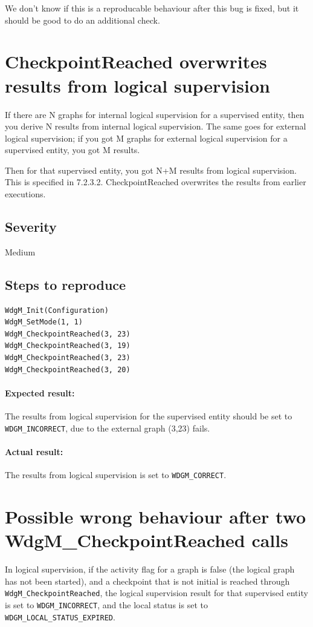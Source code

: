 We don't know if this is a reproducable behaviour after this bug is
fixed, but it should be good to do an additional check.

\section{CheckpointReached overwrites results from logical
  supervision}
If there are N graphs for internal logical supervision for a
supervised entity, then you derive N results from internal logical
supervision. The same goes for external logical supervision; if you
got M graphs for external logical supervision for a supervised entity,
you got M results.

Then for that supervised entity, you got N+M results from logical
supervision. This is specified in 7.2.3.2.
CheckpointReached overwrites the results from earlier executions.

\subsection{Severity}
Medium

\subsection{Steps to reproduce}
\begin{lstlisting}
WdgM_Init(Configuration)
WdgM_SetMode(1, 1)
WdgM_CheckpointReached(3, 23)
WdgM_CheckpointReached(3, 19)
WdgM_CheckpointReached(3, 23)
WdgM_CheckpointReached(3, 20)
\end{lstlisting}
\paragraph{Expected result:}
The results from logical supervision for the supervised entity should
be set to \lstinline!WDGM_INCORRECT!, due to the external graph (3,23) fails.
\paragraph{Actual result:}
The results from logical supervision is set to \lstinline!WDGM_CORRECT!.

\section{Possible wrong behaviour after two WdgM\_CheckpointReached calls}
In logical supervision, if the activity flag for a graph is false (the
logical graph has not been started), and a checkpoint that is not
initial is reached through \lstinline!WdgM_CheckpointReached!, the logical
supervision result for that supervised entity is set to
\lstinline!WDGM_INCORRECT!, and the local status is set to
\lstinline!WDGM_LOCAL_STATUS_EXPIRED!.

